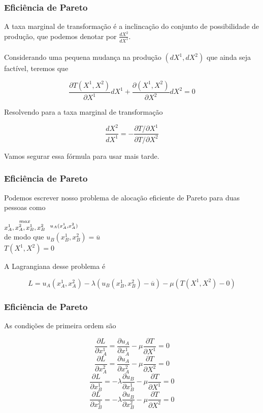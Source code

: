 \documentclass{beamer}[10]
\begin{document}
\begin{frame}
	\frametitle{Eficiência de Pareto}

	A taxa marginal de transformação é a inclincação do conjunto de possibilidade de produção, que podemos denotar por $\frac{d X^2}{d X^1}$.
	\\~\\
	Considerando uma pequena mudança na produção $(dX^1,dX^2)$ que ainda seja factível, teremos que

	$$ \frac{\partial T(X^1,X^2)}{\partial X^1} dX^1 + \frac{\partial (X^1,X^2)}{\partial X^2} dX^2 = 0 $$

	Resolvendo para a taxa marginal de transformação

	$$ \frac{d X^2}{d X^1} = - \frac{\partial T/\partial X^1}{\partial T/\partial X^2}  $$

	Vamos segurar essa fórmula para usar mais tarde.

\end{frame}


\begin{frame}
	\frametitle{Eficiência de Pareto}

	Podemos escrever nosso problema de alocação eficiente de Pareto para duas pessoas como

	\begin{center}
		\LARGE $\stackrel{max}{\text{\small $x^1_A,x^2_A,x^1_B,x^2_B$}} \ \ \stackrel{u_A(x^1_A,x^2_A)}{}$ \\
		\normalsize de modo que $u_B(x^1_B,x^2_B) = \overline{u}$ \\
		\normalsize \hphantom{de modo que } $ T(X^1,X^2) = 0 $
	\end{center}

	A Lagrangiana desse problema é

	$$ L = u_A(x^1_A,x^2_A) - \lambda(u_B(x^1_B,x^2_B) - \overline{u}) - \mu(T(X^1,X^2) - 0) $$

\end{frame}

\begin{frame}
	\frametitle{Eficiência de Pareto}

	As condições de primeira ordem são

	$$ \frac{\partial L}{\partial x^1_A} = \frac{\partial u_A}{\partial x^1_A} - \mu\frac{\partial T}{\partial X^1} = 0 $$
	$$ \frac{\partial L}{\partial x^2_A} = \frac{\partial u_A}{\partial x^2_A} - \mu\frac{\partial T}{\partial X^2} = 0 $$
	$$ \frac{\partial L}{\partial x^1_B} = -\lambda\frac{\partial u_B}{\partial x^1_B} - \mu\frac{\partial T}{\partial X^1} = 0 $$
	$$ \frac{\partial L}{\partial x^2_B} = -\lambda\frac{\partial u_B}{\partial x^2_B} - \mu\frac{\partial T}{\partial X^2} = 0 $$

\end{frame}
\end{document}
